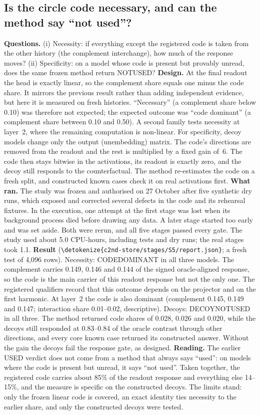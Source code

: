 \documentclass[11pt,a4paper]{article}
\DeclareRobustCommand{\_}{\ifmmode\origunderscore\else\textunderscore\allowbreak\fi}
\DeclareRobustCommand{\fpath}[1]{\begingroup\small\expandafter\nolinkurl\expandafter{\detokenize{#1}}\endgroup}
\begin{document}
\subsection{Is the circle code necessary, and can the method say ``not used''?}\label{sec:c2nd}
\textbf{Questions.} (i) Necessity: if everything except the registered code is taken from the
other history (the complement interchange), how much of the response moves? (ii) Specificity:
on a model whose code is present but provably unread, does the same frozen method return
NOT\_USED?
\textbf{Design.} At the final readout the head is exactly linear, so the complement share equals
one minus the code share. It mirrors the previous result rather than adding independent
evidence, but here it is measured on fresh histories. ``Necessary'' (a complement share below
0.10) was therefore not expected; the expected outcome was ``code dominant'' (a complement share
between 0.10 and 0.50). A second family tests necessity at layer~2, where the remaining
computation is non-linear. For specificity, decoy models change only the output (unembedding)
matrix. The code's directions are removed from the readout and the rest is multiplied by a fixed
gain of~6. The code then stays bitwise in the activations, its readout is exactly zero, and the
decoy still responds to the counterfactual. The method re-estimates the code on a fresh split,
and constructed known cases check it on real activations first.
\textbf{What ran.} The study was frozen and authorised on 27 October after five synthetic dry
runs, which exposed and corrected several defects in the code and its rehearsal fixtures. In
the execution, one attempt at the first stage was lost when its background process died before
drawing any data. A later stage started too early and was set aside. Both were rerun, and all
five stages passed every gate. The study used about 5.0 CPU-hours, including tests and dry
runs; the real stages took 1.1.
\textbf{Result} (\fpath{c2nd-store/stages/S5/report.json}; a fresh test of 4,096 rows).
Necessity: CODE\_DOMINANT in all three models. The complement carries 0.149, 0.146 and 0.144 of
the signed oracle-aligned response, so the code is the main carrier of this readout response but
not the only one. The registered qualifiers record that this outcome depends on the projector and
on the first harmonic. At layer~2 the code is also dominant (complement 0.145, 0.149 and 0.147;
interaction share 0.01--0.02, descriptive). Decoys: DECOY\_NOT\_USED in all three. The method
returned code shares of 0.028, 0.026 and 0.020, while the decoys still responded at 0.83--0.84
of the oracle contrast through other directions, and every core known case returned its
constructed answer. Without the gain the decoys fail the response gate, as designed.
\textbf{Reading.} The earlier USED verdict does not come from a method that always says
``used'': on models where the code is present but unread, it says ``not used''. Taken together,
the registered code carries about 85\% of the readout response and everything else 14--15\%, and
the measure is specific on the constructed decoys. The limits stand: only the frozen linear code
is covered, an exact identity ties necessity to the earlier share, and only the constructed
decoys were tested.
\end{document}
